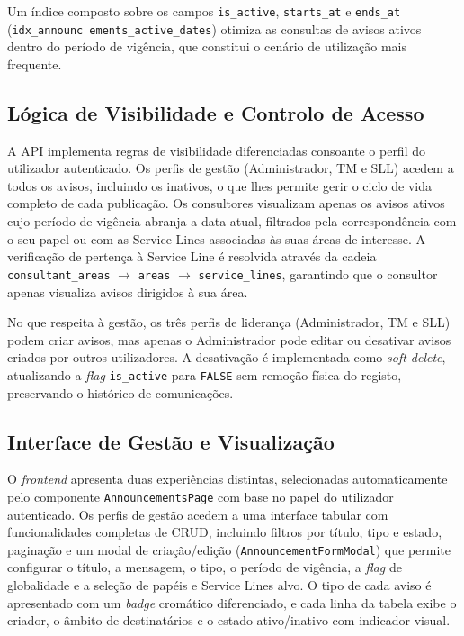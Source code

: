 \documentclass[12pt,a4paper]{report}
\begin{document}
Um índice composto sobre os campos \texttt{is\_active}, \texttt{starts\_at} e \texttt{ends\_at} (\texttt{idx\_announc ements\_active\_dates}) otimiza as consultas de avisos ativos dentro do período de vigência, que constitui o cenário de utilização mais frequente.

\subsection{Lógica de Visibilidade e Controlo de Acesso}

A API implementa regras de visibilidade diferenciadas consoante o perfil do utilizador autenticado. Os perfis de gestão (Administrador, TM e SLL) acedem a todos os avisos, incluindo os inativos, o que lhes permite gerir o ciclo de vida completo de cada publicação. Os consultores visualizam apenas os avisos ativos cujo período de vigência abranja a data atual, filtrados pela correspondência com o seu papel ou com as Service Lines associadas às suas áreas de interesse. A verificação de pertença à Service Line é resolvida através da cadeia \texttt{consultant\_areas} $\rightarrow$ \texttt{areas} $\rightarrow$ \texttt{service\_lines}, garantindo que o consultor apenas visualiza avisos dirigidos à sua área.

No que respeita à gestão, os três perfis de liderança (Administrador, TM e SLL) podem criar avisos, mas apenas o Administrador pode editar ou desativar avisos criados por outros utilizadores. A desativação é implementada como \textit{soft delete}, atualizando a \textit{flag} \texttt{is\_active} para \texttt{FALSE} sem remoção física do registo, preservando o histórico de comunicações.

\subsection{Interface de Gestão e Visualização}

O \textit{frontend} apresenta duas experiências distintas, selecionadas automaticamente pelo componente \texttt{AnnouncementsPage} com base no papel do utilizador autenticado. Os perfis de gestão acedem a uma interface tabular com funcionalidades completas de CRUD, incluindo filtros por título, tipo e estado, paginação e um modal de criação/edição (\texttt{AnnouncementFormModal}) que permite configurar o título, a mensagem, o tipo, o período de vigência, a \textit{flag} de globalidade e a seleção de papéis e Service Lines alvo. O tipo de cada aviso é apresentado com um \textit{badge} cromático diferenciado, e cada linha da tabela exibe o criador, o âmbito de destinatários e o estado ativo/inativo com indicador visual.
\end{document}
